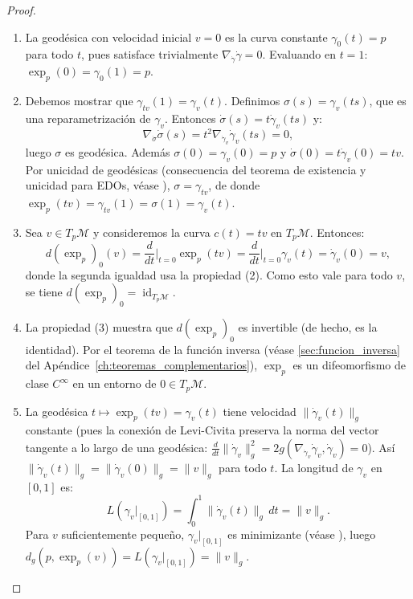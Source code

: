 \begin{proof}
\leavevmode
\begin{enumerate}
	\item La geodésica con velocidad inicial $v = 0$ es la curva constante $\gamma_0(t) = p$ para todo $t$, pues satisface trivialmente $\nabla_{\dot{\gamma}} \dot{\gamma} = 0$. Evaluando en $t = 1$: $\exp_p(0) = \gamma_0(1) = p$.

	\item Debemos mostrar que $\gamma_{tv}(1) = \gamma_v(t)$. Definimos $\sigma(s) = \gamma_v(ts)$, que es una reparametrización de $\gamma_v$. Entonces $\dot{\sigma}(s) = t \dot{\gamma}_v(ts)$ y:
	\[
	\nabla_{\dot{\sigma}} \dot{\sigma}(s) = t^2 \nabla_{\dot{\gamma}_v} \dot{\gamma}_v(ts) = 0,
	\]
	luego $\sigma$ es geodésica. Además $\sigma(0) = \gamma_v(0) = p$ y $\dot{\sigma}(0) = t \dot{\gamma}_v(0) = tv$. Por unicidad de geodésicas (consecuencia del teorema de existencia y unicidad para EDOs, véase \citep[Teorema~4.10]{lee2018introduction}), $\sigma = \gamma_{tv}$, de donde $\exp_p(tv) = \gamma_{tv}(1) = \sigma(1) = \gamma_v(t)$.

	\item Sea $v \in T_p\mathcal{M}$ y consideremos la curva $c(t) = tv$ en $T_p\mathcal{M}$. Entonces:
	\[
	d(\exp_p)_0(v) = \frac{d}{dt}\bigg|_{t=0} \exp_p(tv) = \frac{d}{dt}\bigg|_{t=0} \gamma_v(t) = \dot{\gamma}_v(0) = v,
	\]
	donde la segunda igualdad usa la propiedad (2). Como esto vale para todo $v$, se tiene $d(\exp_p)_0 = \operatorname{id}_{T_p\mathcal{M}}$.

	\item La propiedad (3) muestra que $d(\exp_p)_0$ es invertible (de hecho, es la identidad). Por el teorema de la función inversa (véase \autoref{sec:funcion_inversa} del Apéndice~\ref{ch:teoremas_complementarios}), $\exp_p$ es un difeomorfismo de clase $C^\infty$ en un entorno de $0 \in T_p\mathcal{M}$.

	\item La geodésica $t \mapsto \exp_p(tv) = \gamma_v(t)$ tiene velocidad $\|\dot{\gamma}_v(t)\|_g$ constante (pues la conexión de Levi-Civita preserva la norma del vector tangente a lo largo de una geodésica: $\frac{d}{dt}\|\dot{\gamma}_v\|_g^2 = 2g(\nabla_{\dot{\gamma}_v}\dot{\gamma}_v, \dot{\gamma}_v) = 0$). Así $\|\dot{\gamma}_v(t)\|_g = \|\dot{\gamma}_v(0)\|_g = \|v\|_g$ para todo $t$. La longitud de $\gamma_v$ en $[0,1]$ es:
	\[
	L(\gamma_v|_{[0,1]}) = \int_0^1 \|\dot{\gamma}_v(t)\|_g \, dt = \|v\|_g.
	\]
	Para $v$ suficientemente pequeño, $\gamma_v|_{[0,1]}$ es minimizante (véase \citep[Teorema~6.15]{lee2018introduction}), luego $d_g(p, \exp_p(v)) = L(\gamma_v|_{[0,1]}) = \|v\|_g$. \qedhere
\end{enumerate}
\end{proof}

